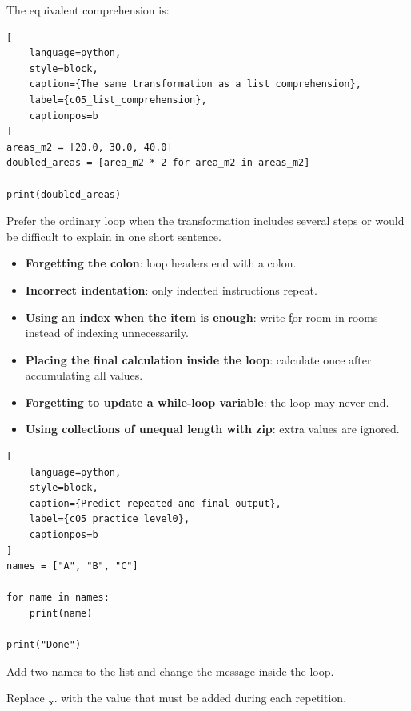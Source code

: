 The equivalent comprehension is:

\begin{lstlisting}[
    language=python,
    style=block,
    caption={The same transformation as a list comprehension},
    label={c05_list_comprehension},
    captionpos=b
]
areas_m2 = [20.0, 30.0, 40.0]
doubled_areas = [area_m2 * 2 for area_m2 in areas_m2]

print(doubled_areas)
\end{lstlisting}

Prefer the ordinary loop when the transformation includes several steps or
would be difficult to explain in one short sentence.


\begin{itemize}
    \item \textbf{Forgetting the colon}: loop headers end with a colon.
    \item \textbf{Incorrect indentation}: only indented instructions repeat.
    \item \textbf{Using an index when the item is enough}: write
          \c{for room in rooms} instead of indexing unnecessarily.
    \item \textbf{Placing the final calculation inside the loop}: calculate once
          after accumulating all values.
    \item \textbf{Forgetting to update a while-loop variable}: the loop may never end.
    \item \textbf{Using collections of unequal length with zip}: extra values are ignored.
\end{itemize}



\begin{lstlisting}[
    language=python,
    style=block,
    caption={Predict repeated and final output},
    label={c05_practice_level0},
    captionpos=b
]
names = ["A", "B", "C"]

for name in names:
    print(name)

print("Done")
\end{lstlisting}


Add two names to the list and change the message inside the loop.


Replace \c{...} with the value that must be added during each repetition.

